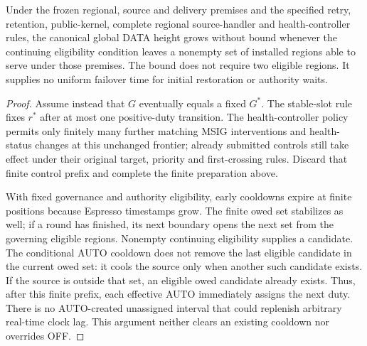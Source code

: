 \begin{proposition}
\label{prop:v35-global-progress}
Under the frozen regional, source and delivery premises and the specified
retry, retention, public-kernel, complete regional source-handler and
health-controller rules, the canonical global DATA height grows without bound whenever the continuing eligibility condition
leaves a nonempty set of installed regions able to serve under those
premises. The bound does not require two eligible regions. It supplies
no uniform failover time for initial restoration or authority waits.
\end{proposition}
\begin{proof}
Assume instead that $G$ eventually equals a fixed $G^*$. The stable-slot
rule fixes $r^*$ after at most one positive-duty transition. The
health-controller policy permits only finitely many further matching
MSIG interventions and health-status changes at this unchanged frontier;
already submitted controls still take effect under their original
target, priority and first-crossing rules. Discard that finite control
prefix and complete the finite preparation above.

With fixed governance and authority eligibility, early cooldowns expire
at finite positions because Espresso timestamps grow. The finite owed
set stabilizes as well; if a round has finished, its next boundary opens
the next set from the governing eligible regions. Nonempty continuing
eligibility supplies a candidate. The conditional AUTO cooldown does
not remove the last eligible candidate in the current owed set: it
cools the source only when another such candidate exists. If the source
is outside that set, an eligible owed candidate already exists. Thus,
after this finite prefix, each effective AUTO immediately assigns the
next duty. There is no AUTO-created unassigned interval that could
replenish arbitrary real-time clock lag. This argument neither clears
an existing cooldown nor overrides OFF.


\end{proof}
